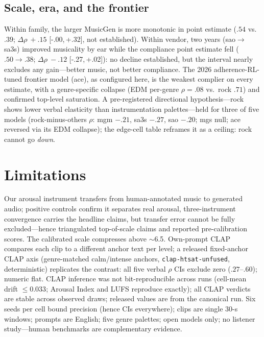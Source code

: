 \documentclass{article}
\newcommand{\ci}[2]{[#1,\,#2]}
\newcommand{\inst}{Arousal Index}
\begin{document}
\subsection{Scale, era, and the frontier}
\label{sec:narratives}

Within family, the larger MusicGen is more monotonic in point estimate
($.54$ vs.\ $.39$; $\Delta\rho\ {+}.15$ \ci{-.00}{+.32}, not established).
Within vendor, two years (sao$\to$sa3s) improved musicality by ear while the
compliance point estimate fell ($.50\to.38$; $\Delta\rho\ {-}.12$
\ci{-.27}{+.02}): no decline established, but the interval nearly excludes
any gain---better music, not better compliance.
The 2026 adherence-RL-tuned frontier model (ace), as configured here, is the weakest complier on
every estimate, with a genre-specific collapse (EDM per-genre $\rho{=}.08$
vs.\ rock $.71$) and confirmed top-level saturation. A pre-registered directional hypothesis---rock shows lower verbal
elasticity than instrumentation palettes---held for three of five models
(rock-minus-others $\rho$: mgm $-.21$, sa3s $-.27$, sao $-.20$; mgs null;
ace reversed via its EDM collapse); the edge-cell table reframes it as a
ceiling: rock cannot go \emph{down}.

\section{Limitations}
\label{sec:limits}

Our arousal instrument transfers from human-annotated music to generated
audio; positive controls confirm it separates real arousal, three-instrument
convergence carries the headline claims, but transfer error cannot be fully
excluded---hence triangulated top-of-scale claims and reported
pre-calibration scores. The calibrated scale compresses above $\sim$6.5.
Own-prompt CLAP compares each clip to a different anchor text per level; a
released fixed-anchor CLAP axis (genre-matched calm/intense anchors,
\texttt{clap-htsat-unfused}, deterministic) replicates the contrast: all
five verbal $\rho$ CIs exclude zero ($.27$--$.60$); numeric flat.
CLAP inference was not bit-reproducible across runs (cell-mean drift
$\le 0.033$; \inst{} and LUFS reproduce exactly); all CLAP verdicts are
stable across observed draws; released values are from the canonical run. Six seeds per cell bound precision (hence CIs
everywhere); clips are single 30-s windows; prompts are English; five genre
palettes; open models only; no listener
study---human benchmarks \citep{go2025aimoclips} are complementary evidence.
\end{document}

